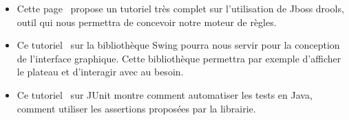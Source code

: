 \begin{itemize}
		\item Cette page~\cite{ref6} propose un tutoriel très complet sur l'utilisation de Jboss drools, outil qui nous permettra de concevoir notre moteur de règles.
		\\[0.7\baselineskip]

		\item Ce tutoriel~\cite{ref7} sur la bibliothèque Swing pourra nous servir pour la conception de l'interface graphique. Cette bibliothèque 
		permettra par exemple d'afficher le plateau et d'interagir avec au besoin.
		\\[0.7\baselineskip]

		\item Ce tutoriel~\cite{ref8} sur JUnit montre comment automatiser les tests en Java, comment utiliser les assertions proposées par la librairie. 
		\\[0.7\baselineskip]

	\end{itemize}
